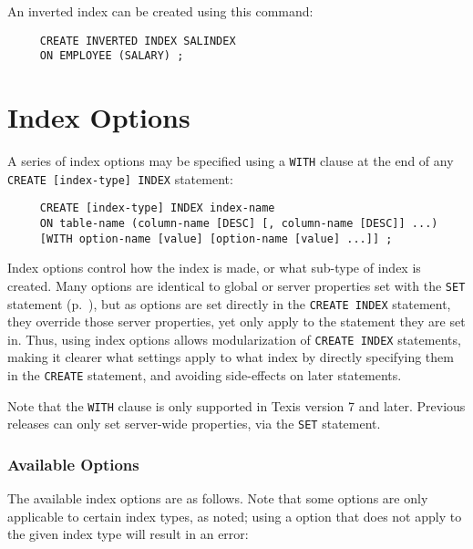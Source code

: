 An inverted index can be created using this command:
\begin{verbatim}
     CREATE INVERTED INDEX SALINDEX
     ON EMPLOYEE (SALARY) ;
\end{verbatim}

\section{Index Options}
\label{IndexOptions}

  A series of index options may be specified using a {\tt WITH} clause
at the end of any {\tt CREATE [index-type] INDEX} statement:

\begin{verbatim}
     CREATE [index-type] INDEX index-name
     ON table-name (column-name [DESC] [, column-name [DESC]] ...)
     [WITH option-name [value] [option-name [value] ...]] ;
\end{verbatim}

  Index options control how the index is made, or what sub-type of
index is created.  Many options are identical to global or server
properties set with the {\tt SET} statement
(p.~\pageref{ServerProperties}), but as options are set directly in
the {\tt CREATE INDEX} statement, they override those server
properties, yet only apply to the statement they are set in.  Thus,
using index options allows modularization of {\tt CREATE INDEX}
statements, making it clearer what settings apply to what index by
directly specifying them in the {\tt CREATE} statement, and avoiding
side-effects on later statements.

  Note that the {\tt WITH} clause is only supported in Texis version 7
and later.  Previous releases can only set server-wide properties, via
the {\tt SET} statement.

\subsubsection{Available Options}

  The available index options are as follows.  Note that some options
are only applicable to certain index types, as noted; using a option
that does not apply to the given index type will result in an error:

